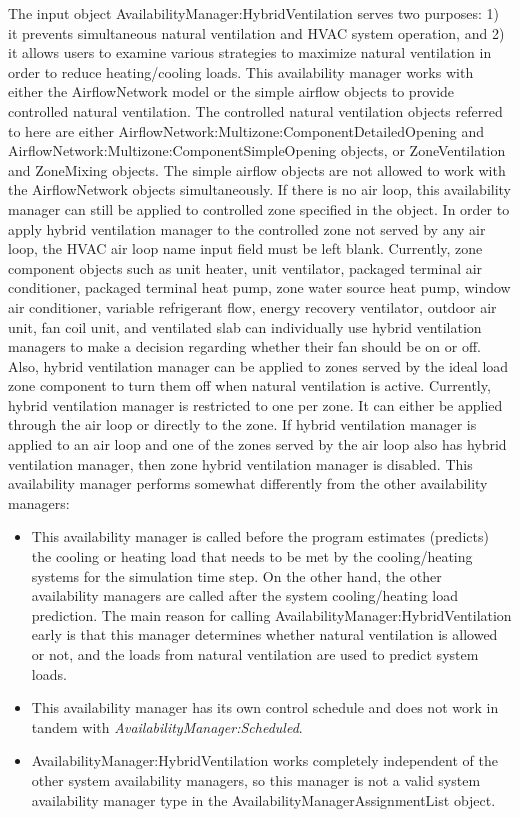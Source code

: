 The input object AvailabilityManager:HybridVentilation serves two purposes: 1) it prevents simultaneous natural ventilation and HVAC system operation, and 2) it allows users to examine various strategies to maximize natural ventilation in order to reduce heating/cooling loads. This availability manager works with either the AirflowNetwork model or the simple airflow objects to provide controlled natural ventilation. The controlled natural ventilation objects referred to here are either AirflowNetwork:Multizone:ComponentDetailedOpening and AirflowNetwork:Multizone:ComponentSimpleOpening objects, or ZoneVentilation and ZoneMixing objects. The simple airflow objects are not allowed to work with the AirflowNetwork objects simultaneously. If there is no air loop, this availability manager can still be applied to controlled zone specified in the object. In order to apply hybrid ventilation manager to the controlled zone not served by any air loop, the HVAC air loop name input field must be left blank. Currently, zone component objects such as unit heater, unit ventilator, packaged terminal air conditioner, packaged terminal heat pump, zone water source heat pump, window air conditioner, variable refrigerant flow, energy recovery ventilator, outdoor air unit, fan coil unit, and ventilated slab can individually use hybrid ventilation managers to make a decision regarding whether their fan should be on or off. Also, hybrid ventilation manager can be applied to zones served by the ideal load zone component to turn them off when natural ventilation is active. Currently, hybrid ventilation manager is restricted to one per zone. It can either be applied through the air loop or directly to the zone. If hybrid ventilation manager is applied to an air loop and one of the zones served by the air loop also has hybrid ventilation manager, then zone hybrid ventilation manager is disabled. This availability manager performs somewhat differently from the other availability managers:

\begin{itemize}
\item This availability manager is called before the program estimates (predicts) the cooling or heating load that needs to be met by the cooling/heating systems for the simulation time step. On the other hand, the other availability managers are called after the system cooling/heating load prediction. The main reason for calling AvailabilityManager:HybridVentilation early is that this manager determines whether natural ventilation is allowed or not, and the loads from natural ventilation are used to predict system loads.
\item This availability manager has its own control schedule and does not work in tandem with \emph{AvailabilityManager:Scheduled}.
\item AvailabilityManager:HybridVentilation works completely independent of the other system availability managers, so this manager is not a valid system availability manager type in the AvailabilityManagerAssignmentList object.
\end{itemize}


